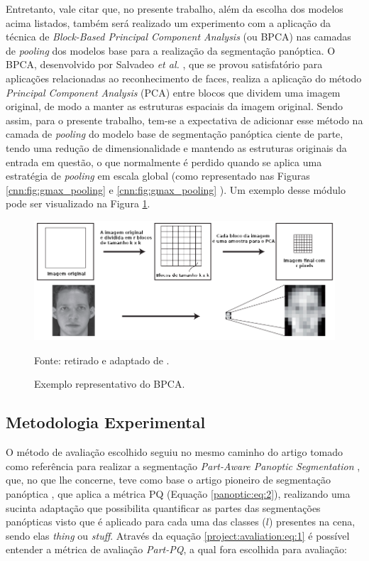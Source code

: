 Entretanto, vale citar que, no presente trabalho, além da escolha dos modelos acima listados, também será realizado um experimento com a aplicação da técnica de \textit{Block-Based Principal Component Analysis} (ou BPCA) nas camadas de \textit{pooling} dos modelos base para a realização da segmentação panóptica. O BPCA, desenvolvido por Salvadeo \textit{et al.} \cite{Salvadeo2011}, que se provou satisfatório para aplicações relacionadas ao reconhecimento de faces, realiza a aplicação do método \textit{Principal Component Analysis} (PCA) entre blocos que dividem uma imagem original, de modo a manter as estruturas espaciais da imagem original. Sendo assim, para o presente trabalho, tem-se a expectativa de adicionar esse método na camada de \textit{pooling} do modelo base  de segmentação panóptica ciente de parte, tendo uma redução de dimensionalidade e mantendo as estruturas originais da entrada em questão, o que normalmente é perdido quando se aplica uma estratégia de \textit{pooling} em escala global (como representado nas Figuras \ref{cnn:fig:gmax_pooling} e \ref{cnn:fig:gmax_pooling} ).  Um exemplo desse módulo pode ser visualizado na Figura \ref{project:pcapooling:fig:3}.

\begin{figure}[H]
    \centering
    \caption{Exemplo representativo do BPCA.}
    \includegraphics[width=1\textwidth]{recursos/imagens/project/BPCA.png}
    \label{project:pcapooling:fig:3}

    Fonte: retirado e adaptado de \cite{Salvadeo2011}.
\end{figure}

\subsection{Metodologia Experimental}
\label{project:exp_result}
O método de avaliação escolhido seguiu no mesmo caminho do artigo tomado como referência para realizar a segmentação \textit{Part-Aware Panoptic Segmentation} \cite{DeGeus2021}, que, no que lhe concerne, teve como base o artigo pioneiro de segmentação panóptica \cite{Kirillov2019a}, que aplica a métrica PQ (Equação \ref{panoptic:eq:2}), realizando uma sucinta adaptação que possibilita quantificar as partes das segmentações panópticas visto que é aplicado para cada uma das classes ($l$) presentes na cena, sendo elas \textit{thing} ou \textit{stuff}. Através da equação \ref{project:avaliation:eq:1} é possível entender a métrica de avaliação \textit{Part-PQ}, a qual fora escolhida para avaliação:

